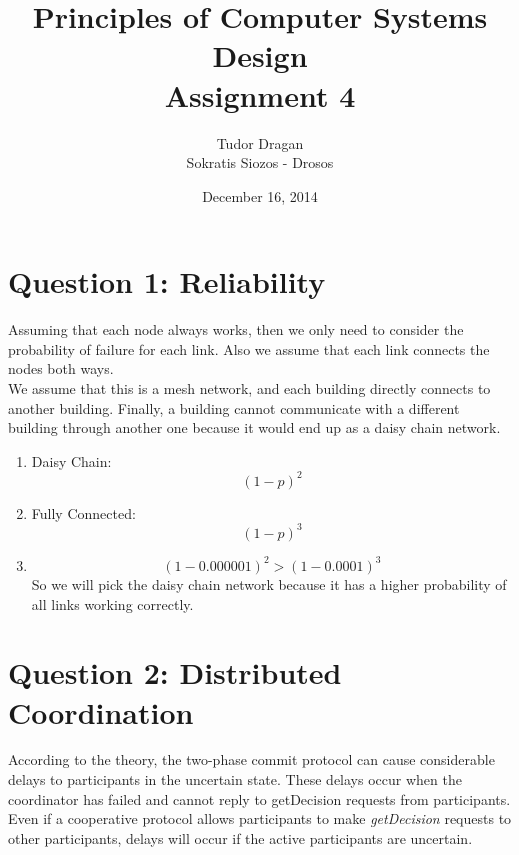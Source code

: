 \documentclass{article}      %
\title{\bf Principles of Computer Systems Design\\ {\Large Assignment 4}}  %
\author{Tudor Dragan\\
Sokratis Siozos - Drosos}      %
\date{December 16, 2014}      %
\begin{document}

\maketitle                   %

\section*{Question 1: Reliability} 

Assuming that each node always works, then we only need to consider the probability of failure for each link. Also we assume that each link connects the nodes both ways.\\

We assume that this is a mesh network, and each building directly connects to another building. Finally, a building cannot communicate with a different building through another one because it would end up as a daisy chain network.\\

\begin{enumerate}
\item  
Daisy Chain: 
\begin{equation}
(1-p)^2
\end{equation}

\item  
Fully Connected:
\begin{equation}
(1-p)^3
\end{equation}

\item 
\begin{equation}
(1-0.000001)^2 > (1-0.0001)^3
\end{equation}
So we will pick the daisy chain network because it has a higher probability of all links working correctly.
\end{enumerate}

\section*{Question 2: Distributed Coordination}

According to the theory, the two-phase commit protocol can cause considerable delays to participants in the uncertain state. These delays occur when the coordinator has failed and cannot reply to getDecision requests from participants. Even if a cooperative protocol allows participants to make \emph{getDecision} requests to other participants, delays will occur if the active participants are uncertain.  \\
\end{document}
